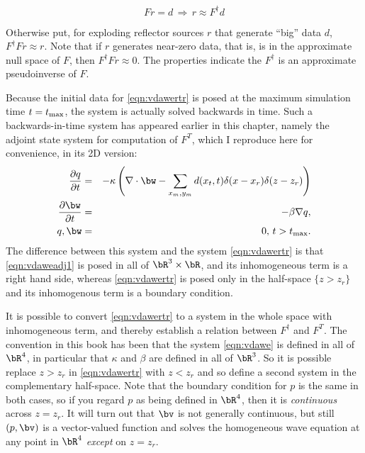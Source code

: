 \[
Fr = d \, \Rightarrow\, r \approx F^{\dagger}d
\]

Otherwise put, for exploding reflector sources $r$ that generate ``big'' data $d$, $F^{\dagger}F r \approx r$. Note that if $r$ generates near-zero data, that is, is in the approximate null space of $F$, then  $F^{\dagger}F r \approx 0$. The properties indicate the $F^{\dagger}$ is an approximate pseudoinverse of $F$.

Because the initial data for \ref{eqn:vdawertr} is posed at the maximum simulation time $t=t_{\rm max}$, the system is actually solved backwards in time. Such a backwards-in-time system has appeared earlier in this chapter, namely the adjoint state system for computation of $F^T$, which I reproduce here for convenience, in its 2D version:
\begin{eqnarray}
\label{eqn:vdaweadj1}
\frac{\partial q}{\partial t}& = &-\kappa\left(\nabla \cdot \bw - \sum_{x_m,y_m}d(x_t,t) \delta(x-x_r)\delta(z-z_r)\right)\nonumber \\
\frac{\partial \bw}{\partial t} & = & -\beta \nabla q,\nonumber \\
q, \bw & = & 0, \, t > t_{\rm max}. 
\end{eqnarray}
The difference between this system and the system \ref{eqn:vdawertr} is that \ref{eqn:vdaweadj1} is posed in all of $\bR^3\times \bR$, and its inhomogeneous term is a right hand side, whereas \ref{eqn:vdawertr} is posed only in the half-space $\{z > z_r\}$ and its inhomogenous term is a boundary condition. 

It is possible to convert \ref{eqn:vdawertr} to a system in the whole space with inhomogeneous term, and thereby establish a relation between $F^{\dagger}$ and $F^T$. The convention in this book has been that the system \ref{eqn:vdawe} is defined in all of $\bR^4$, in particular that $\kappa$ and $\beta$ are defined in all of $\bR^3$. So it is possible replace $z>z_r$ in \ref{eqn:vdawertr} with $z<z_r$ and so define a second system in the complementary half-space. Note that the boundary condition for $p$ is the same in both cases, so if you regard $p$ as being defined in $\bR^4$, then it is {\em continuous} across $z=z_r$. It will turn out that $\bv$ is not generally continuous, but still $(p,\bv)$ is a vector-valued function and solves the homogeneous wave equation at any point in $\bR^4$ {\em except} on $z=z_r$. 

